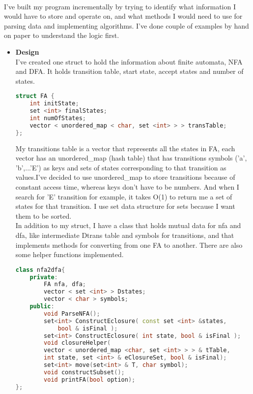 \documentclass[12pt, letterpaper]{article}
\begin{document}
\\
I've built my program incrementally by trying to identify what information I would have to store and operate on, and what methods I would need to use for parsing data and implementing algorithms. I've done couple of examples by hand on paper to understand the logic first. 
\begin{itemize}
	\item {\bf Design} \\
	I've created one struct to hold the information about finite automata, NFA and DFA. It holds transition table, start state, accept states and number of states.
	\begin{lstlisting}[language=C++]
struct FA {
    int initState;
    set <int> finalStates;
    int numOfStates;
    vector < unordered_map < char, set <int> > > transTable;
};
	\end{lstlisting}
	
	My transitions table is a vector that represents all the states in FA, each vector has an unordered\_map (hash table) that has transitions symbols ('a', 'b',...'E') as keys and sets of states corresponding to that transition as values.I've decided to use unordered\_map to store transitions because of constant access time, whereas keys don't have to be numbers. And when I search for 'E' transition for example, it takes O(1) to return me a set of states for that transition. I use set data structure for sets because I want them to be sorted.\\
	In addition to my struct, I have a class that holds mutual data for nfa and dfa, like intermediate Dtrans table and symbols for transitions, and that implements methods for converting from one FA to another. There are also some helper functions implemented.
	\begin{lstlisting}[language=C++]
class nfa2dfa{
    private:
        FA nfa, dfa;
        vector < set <int> > Dstates;
        vector < char > symbols;
    public:
        void ParseNFA();
        set<int> ConstructEclosure( const set <int> &states,
        	bool & isFinal );
        set<int> ConstructEclosure( int state, bool & isFinal );
        void closureHelper( 
		vector < unordered_map <char, set <int> > > & tTable,
		int state, set <int> & eClosureSet, bool & isFinal);
        set<int> move(set<int> & T, char symbol);
        void constructSubset();
        void printFA(bool option);
};	
	\end{lstlisting}
	

\end{itemize}
\end{document}
